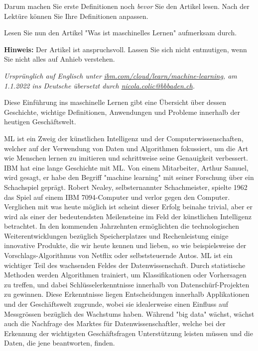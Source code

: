 \begin{lpu}
Darum machen Sie erste Definitionen noch \textit{bevor} Sie den Artikel lesen. Nach der Lektüre können Sie Ihre Definitionen anpassen.

\begin{aufgabe}{2}
Lesen Sie nun den Artikel "Was ist maschinelles Lernen" aufmerksam durch. 
\end{aufgabe}

\textbf{Hinweis:} Der Artikel ist anspruchsvoll. Lassen Sie sich nicht entmutigen, wenn Sie nicht alles auf Anhieb verstehen.

\begin{artikelbox}

\textit{Ursprünglich auf Englisch unter \href{https://www.ibm.com/cloud/learn/machine-learning}{\url{ibm.com/cloud/learn/machine-learning}}, am 1.1.2022 ins Deutsche übersetzt durch \url{nicola.colic@bbbaden.ch}.}

Diese Einführung ins maschinelle Lernen gibt eine Übersicht über dessen Geschichte, wichtige Definitionen, Anwendungen und Probleme innerhalb der heutigen Geschäftswelt.

ML ist ein Zweig der künstlichen Intelligenz und der Computerwissenschaften, welcher auf der Verwendung von Daten und Algorithmen fokussiert, um die Art wie Menschen lernen zu imitieren und schrittweise seine Genauigkeit verbessert.
IBM hat eine lange Geschichte mit ML. Von einem Mitarbeiter, Arthur Samuel, wird gesagt, er habe den Begriff "machine learning" mit seiner Forschung über ein Schachspiel geprägt. Robert Nealey, selbsternannter Schachmeister, spielte 1962 das Spiel auf einem IBM 7094-Computer und verlor gegen den Computer. Verglichen mit was heute möglich ist scheint dieser Erfolg beinahe trivial, aber er wird als einer der bedeutendsten Meilensteine im Feld der künstlichen Intelligenz betrachtet. In den kommenden Jahrzehnten ermöglichten die technologischen Weiterentwicklungen bezüglich Speicherplatzes und Rechenleistung einige innovative Produkte, die wir heute kennen und lieben, so wie beispielsweise der Vorschlags-Algorithmus von Netflix oder selbststeuernde Autos.
ML ist ein wichtiger Teil des wachsenden Feldes der Datenwissenschaft. Durch statistische Methoden werden Algorithmen trainiert, um Klassifikationen oder Vorhersagen zu treffen, und dabei Schlüsselerkenntnisse innerhalb von Datenschürf-Projekten zu gewinnen. Diese Erkenntnisse liegen Entscheidungen innerhalb Applikationen und der Geschäftswelt zugrunde, wobei sie idealerweise einen Einfluss auf Messgrössen bezüglich des Wachstums haben. Während "big data" wächst, wächst auch die Nachfrage des Marktes für Datenwissenschaftler, welche bei der Erkennung der wichtigsten Geschäftsfragen Unterstützung leisten müssen und die Daten, die jene beantworten, finden.


\end{artikelbox}
\end{lpu}
